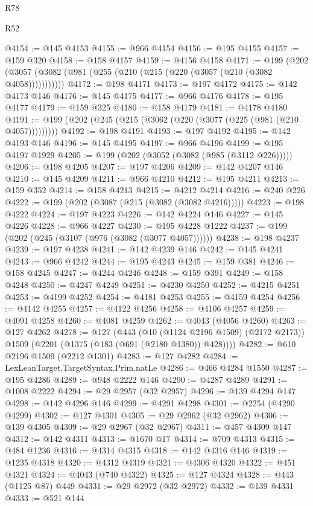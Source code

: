 \begin{lexlean}{R78}
\begin{lexlean}{R52}
\begin{coremodule}
{{{{{{{{{{{{{{{{{{{{{{{{{{{{{{{{{{{{{{{{{{{{{{{{{{{{{{{{{{{{{{{{{{{{{{{{{{{{{{{{{{{{{{{{{{{{{{{{{{{{{{{{{{{{{{{{{{{{{{{{{{{{{{{{{{{{{{{{{{{{{{{{{{{{{{{{{{{{{{{{{{{{{{{{{{{{{{{{{{{{{{{{{{{{{{{{{{{{{{@4154 := @145 @4153
@4155 := @966 @4154
@4156 := @195 @4155
@4157 := @159 @320
@4158 := @158 @4157
@4159 := @4156 @4158
@4171 := @199 (@202 (@3057 (@3082 (@981 (@255 (@210 (@215 (@220 (@3057 (@210 (@3082 @4058)))))))))))
@4172 := @198 @4171
@4173 := @197 @4172
@4175 := @142 @4173 @146
@4176 := @145 @4175
@4177 := @966 @4176
@4178 := @195 @4177
@4179 := @159 @325
@4180 := @158 @4179
@4181 := @4178 @4180
@4191 := @199 (@202 (@245 (@215 (@3062 (@220 (@3077 (@225 (@981 (@210 @4057)))))))))
@4192 := @198 @4191
@4193 := @197 @4192
@4195 := @142 @4193 @146
@4196 := @145 @4195
@4197 := @966 @4196
@4199 := @195 @4197 @1929
@4205 := @199 (@202 (@3052 (@3082 (@985 (@3112 @226)))))
@4206 := @198 @4205
@4207 := @197 @4206
@4209 := @142 @4207 @146
@4210 := @145 @4209
@4211 := @966 @4210
@4212 := @195 @4211
@4213 := @159 @352
@4214 := @158 @4213
@4215 := @4212 @4214
@4216 := @240 @226
@4222 := @199 (@202 (@3087 (@215 (@3082 (@3082 @4216)))))
@4223 := @198 @4222
@4224 := @197 @4223
@4226 := @142 @4224 @146
@4227 := @145 @4226
@4228 := @966 @4227
@4230 := @195 @4228 @1222
@4237 := @199 (@202 (@245 (@3107 (@976 (@3082 (@3077 @4057))))))
@4238 := @198 @4237
@4239 := @197 @4238
@4241 := @142 @4239 @146
@4242 := @145 @4241
@4243 := @966 @4242
@4244 := @195 @4243
@4245 := @159 @381
@4246 := @158 @4245
@4247 := @4244 @4246
@4248 := @159 @391
@4249 := @158 @4248
@4250 := @4247 @4249
@4251 := @4230 @4250
@4252 := @4215 @4251
@4253 := @4199 @4252
@4254 := @4181 @4253
@4255 := @4159 @4254
@4256 := @4142 @4255
@4257 := @4122 @4256
@4258 := @4106 @4257
@4259 := @4091 @4258
@4260 := @4081 @4259
@4262 := @4043 (@4056 @4260)
@4263 := @127 @4262
@4278 := @127
    (@443
      (@10 (@1124 @2196 @1509) (@2172 @2173))
      @1509
      (@2201 (@1375 (@183 (@691 (@2180 @1380)) @428))))
@4282 := @610 @2196 @1509 (@2212 @1301)
@4283 := @127 @4282
@4284 := LexLeanTarget.TargetSyntax.Prim.natLe
@4286 := @466 @4284 @1550
@4287 := @195 @4286
@4289 := @948 @2222 @146
@4290 := @4287 @4289
@4291 := @1008 @2222
@4294 := @29 @2957 (@32 @2957)
@4296 := @139 @4294 @147
@4298 := @142 @4296 @146
@4299 := @4291 @4298
@4301 := @2254 (@4290 @4299)
@4302 := @127 @4301
@4305 := @29 @2962 (@32 @2962)
@4306 := @139 @4305
@4309 := @29 @2967 (@32 @2967)
@4311 := @457 @4309 @147
@4312 := @142 @4311
@4313 := @1670 @17
@4314 := @709 @4313
@4315 := @484 @1236
@4316 := @4314 @4315
@4318 := @142 @4316 @146
@4319 := @1235 @4318
@4320 := @4312 @4319
@4321 := @4306 @4320
@4322 := @451 @4321
@4324 := @4043 (@740 @4322)
@4325 := @127 @4324
@4328 := @443 (@1125 @87) @449
@4331 := @29 @2972 (@32 @2972)
@4332 := @139 @4331
@4333 := @521 @144
}}}}}}}}}}}}}}}}}}}}}}}}}}}}}}}}}}}}}}}}}}}}}}}}}}}}}}}}}}}}}}}}}}}}}}}}}}}}}}}}}}}}}}}}}}}}}}}}}}}}}}}}}}}}}}}}}}}}}}}}}}}}}}}}}}}}}}}}}}}}}}}}}}}}}}}}}}}}}}}}}}}}}}}}}}}}}}}}}}}}}}}}}}}}}}}}}}}}}}
\end{coremodule}
\end{lexlean}
\end{lexlean}
